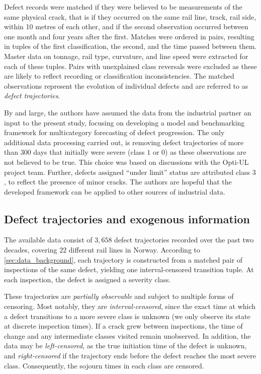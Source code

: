 \documentclass{article}
\begin{document}
Defect records were matched if they were believed to be measurements of the same physical crack, that is if they occurred on the same rail line, track, rail side, within 10 metres of each other, and if the second observation occurred between one month and four years after the first. Matches were ordered in pairs, resulting in tuples of the first classification, the second, and the time passed between them. Master data on tonnage, rail type, curvature, and line speed were extracted for each of these tuples. Pairs with unexplained class reversals were excluded as these are likely to reflect recording or classification inconsistencies. The matched observations represent the evolution of individual defects and are referred to as \textit{defect trajectories}.


By and large, the authors have assumed the data from the industrial partner an input to the present study, focusing on developing a model and benchmarking framework for multicategory forecasting of defect progression. The only additional data processing carried out, is removing defect trajectories of more than 300 days that initially were severe (class $1$ or $0$) as these observations are not believed to be true. This choice was based on discussions with the Opti-UL project team. Further, defects assigned ``under limit'' status are attributed class $3$, to reflect the presence of minor cracks.
The authors are hopeful that the developed framework can be applied to other sources of industrial data.

\subsection{Defect trajectories and exogenous information}\label{sec:defect_trajectories}
The available data consist of $3,658$ defect trajectories recorded over the past two decades, covering $22$ different rail lines in Norway. According to \cref{sec:data_background}, each trajectory is constructed from a matched pair of inspections of the same defect, yielding one interval-censored transition tuple. At each inspection, the defect is assigned a severity class.


These trajectories are \textit{partially observable} and subject to multiple forms of censoring. Most notably, they are \textit{interval-censored}, since the exact time at which a defect transitions to a more severe class is unknown (we only observe its state at discrete inspection times). If a crack grew between inspections, the time of change and any intermediate classes visited remain unobserved. In addition, the data may be \textit{left-censored}, as the true initiation time of the defect is unknown, and \textit{right-censored} if the trajectory ends before the defect reaches the most severe class. Consequently, the sojourn times in each class are censored.
\end{document}
